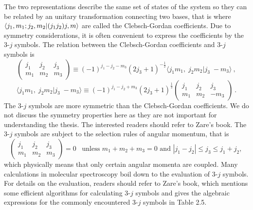 The two representations describe the same set of states of the system so they can be related by an unitary
transformation connecting two bases, that is
where $\langle j_1, m_1; j_2, m_2 | (j_1 j_2)j, m \rangle$ are called the Clebsch-Gordan coefficients. Due to symmetry 
considerations, it is often convenient to express the coefficients by the 3-$j$ symbols. The relation between the Clebsch-Gordan 
coefficients and 3-$j$ symbols is\cite{zare-book}
\begin{equation}
\left( 
\begin{array}{ ccc }
j_{1} & j_{2} & j_{3} \\
m_{1} & m_{2} & m_{3}
\end{array}
\right) \equiv (-1)^{j_{1} - j_{2} - m_{3}} (2j_{3} +1)^{-\frac{1}{2}} \langle j_{1}m_{1}, \; j_{2} m_{2} | j_{3}\; -m_{3}\rangle \ ,
\end{equation}
\begin{equation}
 \langle j_{1}m_{1}, \; j_{2} m_{2} | j_{3}\; -m_{3}\rangle \equiv (-1)^{j_{1} - j_{2} + m_{3}} (2j_{3} +1)^{\frac{1}{2}}
\left( 
\begin{array}{ ccc }
j_{1} & j_{2} & j_{3} \\
m_{1} & m_{2} & -m_{3}
\end{array}
\right)  \ . \label{CG-3j}
\end{equation}
The 3-$j$ symbols are more symmetric than the Clebsch-Gordan coefficients. We do not discuss the symmetry properties here as they are not important for understanding the thesis. The interested readers should refer to Zare's book\cite{zare-book}.  The 3-$j$ symbols are subject to the selection rules of angular momentum, that is
\begin{equation}
\left(
\begin{array}{ccc}
j_{1}&j_{2}&j_{3} \\
m_{1}&m_{2}&m_{3}
\end{array}
\right)
=0 \;\;\; \mbox{unless $m_{1} + m_{2} + m_{3} = 0$ and $|j_1 - j_2| \leq j_3 \leq j_1 + j_2$, } \nonumber 
\end{equation}
which physically means that only certain angular momenta are coupled. Many calculations in molecular spectroscopy boil
down to the evaluation of 3-$j$ symbols. For details on the evaluation, readers should refer to Zare's book\cite{zare-book}, which mentions some efficient algorithms for calculating 3-$j$ 
symbols and gives the algebraic expressions for the commonly encountered 3-$j$ symbols in Table 2.5. 
 

